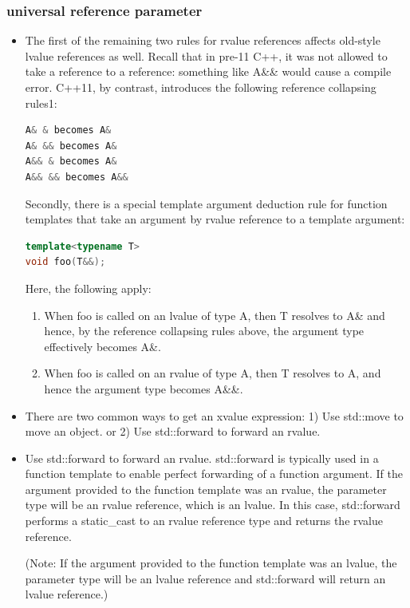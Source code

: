 \documentclass[a4paper,12pt,twoside]{book}
\begin{document}
\subsubsection{universal reference parameter}
\begin{itemize}

\item The first of the remaining two rules for rvalue references affects old-style lvalue references as well. Recall that in pre-11 C++, it was not allowed to take a reference to a reference: something like A\&\& would cause a compile error. C++11, by contrast, introduces the following reference collapsing rules1:
\begin{lstlisting}[frame=single, language=c++]
A& & becomes A&
A& && becomes A&
A&& & becomes A&
A&& && becomes A&&
\end{lstlisting}

Secondly, there is a special template argument deduction rule for function templates that take an argument by rvalue reference to a template argument:
\begin{lstlisting}[frame=single, language=c++]
template<typename T>
void foo(T&&);
\end{lstlisting}
Here, the following apply:
\begin{enumerate}

\item When foo is called on an lvalue of type A, then T resolves to A\& and hence, by the reference collapsing rules above, the argument type effectively becomes A\&.

\item When foo is called on an rvalue of type A, then T resolves to A, and hence the argument type becomes A\&\&.
\end{enumerate}

\item There are two common ways to get an xvalue expression: 1) Use std::move to move an object. or
2) Use std::forward to forward an rvalue.

\item Use std::forward to forward an rvalue. std::forward is typically used in a function template to enable perfect forwarding of a function argument. If the argument provided to the function template was an rvalue, the parameter type will be an rvalue reference, which is an lvalue. In this case, std::forward performs a static\_cast to an rvalue reference type and returns the rvalue reference.

(Note: If the argument provided to the function template was an lvalue, the parameter type will be an lvalue reference and std::forward will return an lvalue reference.)


\end{itemize}
\end{document}
